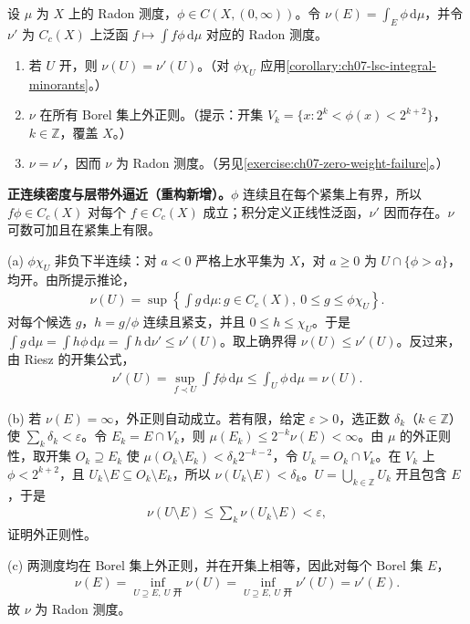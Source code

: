 \documentclass[../../main.tex]{subfiles}
\begin{document}
\begin{exercise}\label{exercise:ch07-positive-continuous-weight}
设 $\mu$ 为 $X$ 上的 Radon 测度，$\phi\in C(X,(0,\infty))$。令 $\nu(E)=\int_E\phi\,\mathrm d\mu$，并令 $\nu'$ 为 $C_c(X)$ 上泛函 $f\mapsto\int f\phi\,\mathrm d\mu$ 对应的 Radon 测度。
\begin{enumerate}[label=\alph*.,ref=(\alph*)]
\item\label{item:ch07-positive-weight-open} 若 $U$ 开，则 $\nu(U)=\nu'(U)$。（对 $\phi\chi_U$ 应用\cref{corollary:ch07-lsc-integral-minorants}。）
\item\label{item:ch07-positive-weight-outer} $\nu$ 在所有 Borel 集上外正则。（提示：开集 $V_k=\{x:2^k<\phi(x)<2^{k+2}\}$，$k\in\mathbb Z$，覆盖 $X$。）
\item\label{item:ch07-positive-weight-radon} $\nu=\nu'$，因而 $\nu$ 为 Radon 测度。（另见\cref{exercise:ch07-zero-weight-failure}。）
\end{enumerate}
\end{exercise}
\begin{solution}
\textbf{正连续密度与层带外逼近（重构新增）。}$\phi$ 连续且在每个紧集上有界，所以 $f\phi\in C_c(X)$ 对每个 $f\in C_c(X)$ 成立；积分定义正线性泛函，$\nu'$ 因而存在。$\nu$ 可数可加且在紧集上有限。

(a) $\phi\chi_U$ 非负下半连续：对 $a<0$ 严格上水平集为 $X$，对 $a\geqslant0$ 为 $U\cap\{\phi>a\}$，均开。由所提示推论，
\begin{align*}
\nu(U)=\sup\left\{\int g\,\mathrm d\mu:g\in C_c(X),\ 0\leqslant g\leqslant\phi\chi_U\right\}.
\end{align*}
对每个候选 $g$，$h=g/\phi$ 连续且紧支，并且 $0\leqslant h\leqslant\chi_U$。于是 $\int g\,\mathrm d\mu=\int h\phi\,\mathrm d\mu=\int h\,\mathrm d\nu'\leqslant\nu'(U)$。取上确界得 $\nu(U)\leqslant\nu'(U)$。反过来，由 Riesz 的开集公式，
\begin{align*}
\nu'(U)=\sup_{f\prec U}\int f\phi\,\mathrm d\mu\leqslant\int_U\phi\,\mathrm d\mu=\nu(U).
\end{align*}

(b) 若 $\nu(E)=\infty$，外正则自动成立。若有限，给定 $\varepsilon>0$，选正数 $\delta_k$（$k\in\mathbb Z$）使 $\sum_k\delta_k<\varepsilon$。令 $E_k=E\cap V_k$，则 $\mu(E_k)\leqslant2^{-k}\nu(E)<\infty$。由 $\mu$ 的外正则性，取开集 $O_k\supseteq E_k$ 使 $\mu(O_k\setminus E_k)<\delta_k2^{-k-2}$，令 $U_k=O_k\cap V_k$。在 $V_k$ 上 $\phi<2^{k+2}$，且 $U_k\setminus E\subseteq O_k\setminus E_k$，所以 $\nu(U_k\setminus E)<\delta_k$。$U=\bigcup_{k\in\mathbb Z}U_k$ 开且包含 $E$，于是
\begin{align*}
\nu(U\setminus E)\leqslant\sum_k\nu(U_k\setminus E)<\varepsilon,
\end{align*}
证明外正则性。

(c) 两测度均在 Borel 集上外正则，并在开集上相等，因此对每个 Borel 集 $E$，
\begin{align*}
\nu(E)=\inf_{U\supseteq E,\ U\text{ 开}}\nu(U)
=\inf_{U\supseteq E,\ U\text{ 开}}\nu'(U)=\nu'(E).
\end{align*}
故 $\nu$ 为 Radon 测度。
\end{solution}
\end{document}
